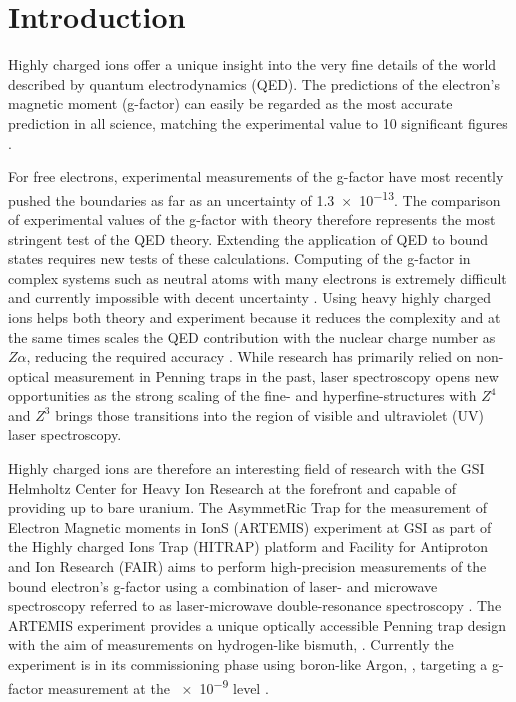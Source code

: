 \chapter{Introduction}
Highly charged ions offer a unique insight into the very fine details of the world described by quantum electrodynamics (QED). The predictions of the electron’s magnetic moment (g-factor) can easily be regarded as the most accurate prediction in all science, matching the experimental value to \num{10} significant figures \cite{gfactor_theory}.

For free electrons, experimental measurements of the g-factor have most recently pushed the boundaries as far as an uncertainty of \num{1.3e-13}. The comparison of experimental values of the g-factor with theory therefore represents the most stringent test of the QED theory. Extending the application of QED to bound states requires new tests of these calculations. Computing of the g-factor in complex systems such as neutral atoms with many electrons is extremely difficult and currently impossible with decent uncertainty \cite{gfactor_theory_codegen}. Using heavy highly charged ions helps both theory and experiment because it reduces the complexity and at the same times scales the QED contribution with the nuclear charge number as $Z\alpha$, reducing the required accuracy \cite{gfactor_ions_scaling}. While research has primarily relied on non-optical measurement in Penning traps in the past, laser spectroscopy opens new opportunities \cite{penning_trap_laser_spectroscopy} as the strong scaling of the fine- and hyperfine-structures with $Z^4$ and $Z^3$ brings those transitions into the region of visible and ultraviolet (UV) laser spectroscopy.

Highly charged ions are therefore an interesting field of research with the GSI Helmholtz Center for Heavy Ion Research at the forefront and capable of providing up to bare uranium. The AsymmetRic Trap for the measurement of Electron Magnetic moments in IonS (ARTEMIS) experiment at GSI as part of the Highly charged Ions Trap (HITRAP) platform and Facility for Antiproton and Ion Research (FAIR) aims to perform high-precision measurements of the bound electron's g-factor using a combination of laser- and microwave spectroscopy referred to as laser-microwave double-resonance spectroscopy \cite{laser_microwave_double_resonance_spectroscopy}. The ARTEMIS experiment provides a unique optically accessible Penning trap design \cite{penning_trap_transparent,penning_trap_half_open} with the aim of measurements on hydrogen-like bismuth, . Currently the experiment is in its commissioning phase using boron-like Argon, , targeting a g-factor measurement at the \num{e-9} level \cite{artemis_commissioning}.

